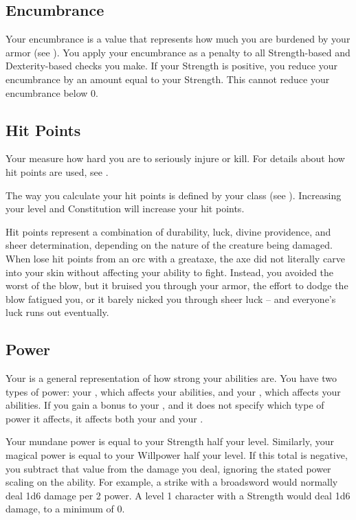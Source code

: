   \subsection{Encumbrance}\label{Encumbrance}
    Your encumbrance is a value that represents how much you are burdened by your armor (see ).
    You apply your encumbrance as a penalty to all Strength-based and Dexterity-based checks you make.
    If your Strength is positive, you reduce your encumbrance by an amount equal to your Strength.
    This cannot reduce your encumbrance below 0.

  \subsection{Hit Points}\label{Hit Points}
    Your  measure how hard you are to seriously injure or kill.
    For details about how hit points are used, see .

    The way you calculate your hit points is defined by your class (see ).
    Increasing your level and Constitution will increase your hit points.

     Hit points represent a combination of durability, luck, divine providence, and sheer determination, depending on the nature of the creature being damaged.
    When lose hit points from an orc with a greataxe, the axe did not literally carve into your skin without affecting your ability to fight.
    Instead, you avoided the worst of the blow, but it bruised you through your armor, the effort to dodge the blow fatigued you, or it barely nicked you through sheer luck -- and everyone's luck runs out eventually.

  \subsection{Power}\label{Power}
    Your  is a general representation of how strong your abilities are.
    You have two types of power: your , which affects your \magical abilities, and your , which affects your  abilities.
    If you gain a bonus to your , and it does not specify which type of power it affects, it affects both your  and your .

    Your mundane power is equal to your Strength \add half your level.
    Similarly, your magical power is equal to your Willpower \add half your level.
    If this total is negative, you subtract that value from the damage you deal, ignoring the stated power scaling on the ability.
    For example, a strike with a broadsword would normally deal 1d6 damage  per 2 power.
    A level 1 character with a  Strength would deal 1d6  damage, to a minimum of 0.

